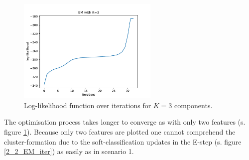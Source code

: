 \documentclass{article}
\begin{document}
\begin{figure}[!ht]
\centering
\includegraphics[width=0.6\textwidth]{./Figures/2_2_EM_likelihood_K3}
\caption{Log-likelihood function over iterations for $K=3$ components.}
\label{2_2_EM_likelihood}
\end{figure}

The optimisation process takes longer to converge as with only two features (s. figure \ref{2_2_EM_likelihood}). Because only two features are plotted one cannot comprehend the cluster-formation due to the soft-classification updates in the E-step (s. figure \ref{2_2_EM_iter}) as easily as in scenario 1.
\end{document}

